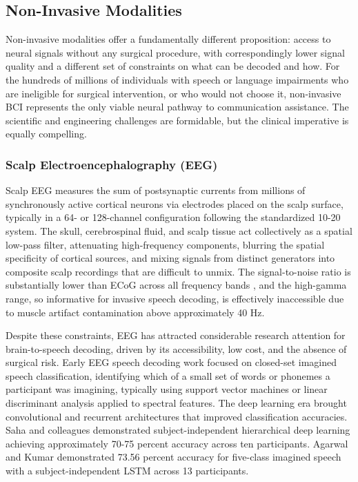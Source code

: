 \subsection{Non-Invasive Modalities}

Non-invasive modalities offer a fundamentally different proposition: access to neural signals without any surgical procedure, with correspondingly lower signal quality and a different set of constraints on what can be decoded and how. For the hundreds of millions of individuals with speech or language impairments who are ineligible for surgical intervention, or who would not choose it, non-invasive BCI represents the only viable neural pathway to communication assistance. The scientific and engineering challenges are formidable, but the clinical imperative is equally compelling.

\subsubsection{Scalp Electroencephalography (EEG)}

Scalp EEG measures the sum of postsynaptic currents from millions of synchronously active cortical neurons via electrodes placed on the scalp surface, typically in a 64- or 128-channel configuration following the standardized 10-20 system. The skull, cerebrospinal fluid, and scalp tissue act collectively as a spatial low-pass filter, attenuating high-frequency components, blurring the spatial specificity of cortical sources, and mixing signals from distinct generators into composite scalp recordings that are difficult to unmix. The signal-to-noise ratio is substantially lower than ECoG across all frequency bands \cite{Schirrmeister2017}, and the high-gamma range, so informative for invasive speech decoding, is effectively inaccessible due to muscle artifact contamination above approximately 40 Hz.

Despite these constraints, EEG has attracted considerable research attention for brain-to-speech decoding, driven by its accessibility, low cost, and the absence of surgical risk. Early EEG speech decoding work focused on closed-set imagined speech classification, identifying which of a small set of words or phonemes a participant was imagining, typically using support vector machines or linear discriminant analysis applied to spectral features. The deep learning era brought convolutional and recurrent architectures that improved classification accuracies. Saha and colleagues \cite{Saha2019} demonstrated subject-independent hierarchical deep learning achieving approximately 70-75 percent accuracy across ten participants. Agarwal and Kumar \cite{Agarwal2022} demonstrated 73.56 percent accuracy for five-class imagined speech with a subject-independent LSTM across 13 participants.

